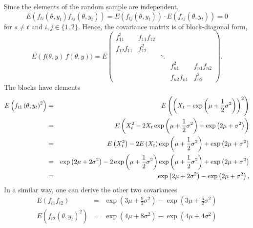 \documentclass{article}
\begin{document}
Since the elements of the random sample are independent,%
\begin{equation*}
E\left( f_{ti}\left( \theta ,y_{t}\right) f_{sj}\left( \theta ,y_{t}\right)
\right) =E\left( f_{tj}\left( \theta ,y_{t}\right) \right) \cdot E\left(
f_{sj}\left( \theta ,y_{t}\right) \right) =0
\end{equation*}%
for $s\neq t$ and $i,j\in \{1,2\}$. Hence, the covariance matrix is of
block-diagonal form,%
\begin{equation*}
E\left( f(\theta ,y\right) \,f\left( \theta ,y\right) )=E\left(
\begin{array}{ccccc}
f_{11}^{2} & f_{11}f_{12} &  &  &  \\
f_{12}f_{11} & f_{12}^{2} &  &  &  \\
&  & \ddots &  &  \\
&  &  & f_{n1}^{2} & f_{n1}f_{n2} \\
&  &  & f_{n2}f_{n1} & f_{n2}^{2}%
\end{array}%
\right) .
\end{equation*}%
The blocks have elements%
\begin{eqnarray*}
E\left( f_{t1}\left( \theta ,y_{t}\right) ^{2}\right) &=&E\left( \left(
X_{t}-\exp \left( \mu +\frac{1}{2}\sigma ^{2}\right) \right) ^{2}\right) \\
&=&E\left( X_{t}^{2}-2X_{t}\exp \left( \mu +\frac{1}{2}\sigma ^{2}\right)
+\exp \left( 2\mu +\sigma ^{2}\right) \right) \\
&=&E\left( X_{t}^{2}\right) -2E\left( X_{t}\right) \exp \left( \mu +\frac{1}{%
2}\sigma ^{2}\right) +\exp \left( 2\mu +\sigma ^{2}\right) \\
&=&\exp \left( 2\mu +2\sigma ^{2}\right) -2\exp \left( \mu +\frac{1}{2}%
\sigma ^{2}\right) \exp \left( \mu +\frac{1}{2}\sigma ^{2}\right) +\exp
\left( 2\mu +\sigma ^{2}\right) \\
&=&\exp \left( 2\mu +2\sigma ^{2}\right) \allowbreak -\exp \left( 2\mu
+\sigma ^{2}\right) ,
\end{eqnarray*}%
In a similar way, one can derive the other two covariances%
\begin{eqnarray*}
E\left( f_{t1}f_{t2}\right) &=&\allowbreak \exp \left( 3\mu +\frac{9}{2}%
\sigma ^{2}\right) -\exp \left( 3\mu +\frac{5}{2}\sigma ^{2}\right) \\
E\left( f_{t2}\left( \theta ,y_{t}\right) ^{2}\right) &=&\exp \left( 4\mu
+8\sigma ^{2}\right) -\exp \left( 4\mu +4\sigma ^{2}\right)
\end{eqnarray*}
\end{document}
